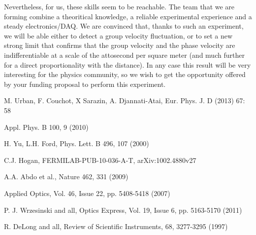 \documentclass[9pt, a4, twoside]{article}
\begin{document}
Nevertheless, for us, these skills seem to be reachable. The team that we are forming combine a theoritical knowledge, a reliable experimental experience and a steady electronics/DAQ. We are convinced that, thanks to such an experiment, we will be able either to detect a group velocity  fluctuation, or to set a new strong limit that confirms that the group velocity and the phase velocity are indifferentiable at a scale of the attosecond per square meter (and much further for a direct  proportionality with the distance). In any case this result will be very interesting for the physics community, so we wish to get the opportunity offered by your funding proposal to perform this experiment.



\begin{thebibliography}{9}

 M. Urban, F. Couchot, X Sarazin, A. Djannati-Atai, Eur. Phys. J. D (2013) 67: 58


 Appl. Phys. B 100, 9 (2010)

 H. Yu, L.H. Ford, Phys. Lett. B 496, 107 (2000)

 C.J. Hogan, FERMILAB-PUB-10-036-A-T, arXiv:1002.4880v27

 A.A. Abdo et al., Nature 462, 331 (2009)

 Applied Optics, Vol. 46, Issue 22, pp. 5408-5418 (2007)

 P. J. Wrzesinski and all, Optics Express, Vol. 19, Issue 6, pp. 5163-5170 (2011)

 R. DeLong and all, Review of Scientific Instruments, 68, 3277-3295 (1997)

\end{thebibliography}
\end{document}
